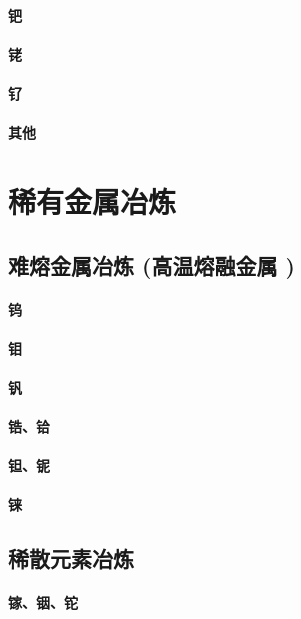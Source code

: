 \documentclass[UTF8]{../../ApplicationUniverse}
\begin{document}
\subsubsection{钯}
\subsubsection{铑}
\subsubsection{钌}
\subsubsection{其他}







\chapter{稀有金属冶炼}
\section{难熔金属冶炼 (高温熔融金属 )}
    \subsubsection{钨}
    \subsubsection{钼}
    \subsubsection{钒}
    \subsubsection{锆、铪}
    \subsubsection{钽、铌}
    \subsubsection{铼}
\section{稀散元素冶炼}
    \subsubsection{镓、铟、铊}
\end{document}

